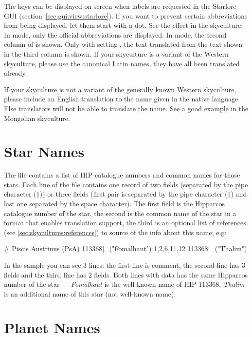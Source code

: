 The keys can be displayed on screen when labels are requested in the
Starlore GUI (section~\ref{sec:gui:view:starlore}). If you want to prevent
certain abbreviations from being displayed, let them start with a
dot. See the effect in the  skyculture: In
 mode, only the official abbreviations are
displayed. In  mode, the second column of
 is shown. Only with setting
, the text translated from the text shown in the
third column is shown. If your skyculture is a variant of the Western
skyculture, please use the canonical Latin names, they have all been translated already.

If your skyculture is not a variant of the generally known Western
skyculture, please include an English translation to the name given in
the native language. Else translators will not be able to translate
the name. See a good example in the Mongolian skyculture.

\section{Star Names}
\label{sec:skycultures:starnames}

The file  contains a list of HIP catalogue
numbers and common names for those stars. Each line of the file
contains one record of two fields (separated by the pipe character
(\texttt{|})) or three fields (first pair is separated by the 
pipe character (\texttt{|}) and last one separated by the space 
character). The first field is the Hipparcos catalogue number of the
star, the second is the common name of the star in a format that enables
translation support, the third is an optional list of references (see \ref{sec:skycultures:references})  
to source of the info about this name, e.g:
\begin{configfile}
# Piscis Austrinus (PsA)
113368|_("Fomalhaut") 1,2,6,11,12
113368|_("Thalim")
\end{configfile}

In the sample you can see 3 lines: the first line is comment, the 
second line has 3 fields and the third line has 2 fields. Both lines 
with data has the same Hipparcos number of the star --- \textit{Fomalhaut} is 
the well-known name of HIP 113368, \textit{Thalim} is an additional name 
of this star (not well-known name).

\section{Planet Names}
\label{sec:skycultures:planetnames}

